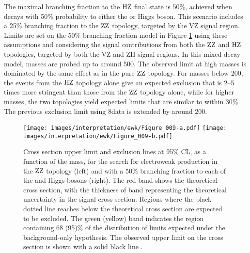The maximal branching fraction to the $\mathrm{H}\mathrm{Z}$ final state is 50\%, achieved when \firstchi decays with 50\% probability to either the \PZ or Higgs boson.
This scenario includes a 25\% branching fraction to the $\mathrm{Z}\mathrm{Z}$ topology, targeted by the VZ signal region.
Limits are set on the 50\% branching fraction model in Figure \ref{fig:LimitTChiZZHZ} using these assumptions and considering the signal contributions from both the $\mathrm{Z}\mathrm{Z}$ and $\mathrm{H}\mathrm{Z}$ topologies, targeted by both the VZ and ZH signal regions.
In this mixed decay model, \firstchi masses are probed up to around 500\GeV.
The observed limit at high masses is dominated by the same effect as in the pure $\mathrm{Z}\mathrm{Z}$ topology.
For masses below 200\GeV, the events from the $\mathrm{H}\mathrm{Z}$ topology alone give an expected exclusion that is 2--5 times more stringent than those from the $\mathrm{Z}\mathrm{Z}$ topology alone, while for higher masses, the two topologies yield expected limits that are similar to within 30\%.
The previous exclusion limit using 8\TeV data is extended by around 200\GeV.
\begin{figure}
\centering
\texttt{[image: images/interpretation/ewk/Figure\_009-a.pdf]}
\texttt{[image: images/interpretation/ewk/Figure\_009-b.pdf]}
\caption{Cross section upper limit and exclusion lines at 95\% CL, as a function of the \firstchi mass, for the search for electroweak production in the $\mathrm{Z}\mathrm{Z}$ topology (left)
  and with a 50\% branching fraction to each of the \PZ and Higgs bosons (right).
The red band shows the theoretical cross section, with the thickness of band representing the theoretical uncertainty in the signal cross section.
Regions where the black dotted line reaches below the theoretical cross section are expected to be excluded.
The green (yellow) band indicates the region containing 68 (95)\% of the distribution of limits expected under the background-only hypothesis.
The observed upper limit on the cross section is shown with a solid black line \cite{Sirunyan:2017qaj}.}
\label{fig:LimitTChiZZHZ}
\end{figure}
